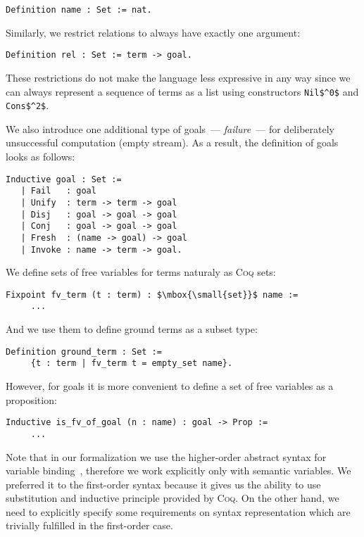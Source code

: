 \begin{lstlisting}[language=Coq]
  Definition name : Set := nat.
\end{lstlisting}

Similarly, we restrict relations to always have exactly one argument:

\begin{lstlisting}[language=Coq]
   Definition rel : Set := term -> goal.
\end{lstlisting}

These restrictions do not make the language less expressive in any way since we can always represent a sequence of terms as a list using constructors \lstinline|Nil$^0$| and \lstinline|Cons$^2$|.

We also introduce one additional type of goals~--- \emph{failure}~--- for deliberately unsuccessful computation (empty stream). As a result, the definition of goals looks as follows:

\begin{lstlisting}[language=Coq] 
   Inductive goal : Set :=
   | Fail   : goal
   | Unify  : term -> term -> goal
   | Disj   : goal -> goal -> goal
   | Conj   : goal -> goal -> goal
   | Fresh  : (name -> goal) -> goal
   | Invoke : name -> term -> goal.
\end{lstlisting}

We define sets of free variables for terms naturaly as \textsc{Coq} sets: 

\begin{lstlisting}[language=Coq,mathescape=true] 
   Fixpoint fv_term (t : term) : $\mbox{\small{set}}$ name :=
     ...
\end{lstlisting}

And we use them to define ground terms as a subset type:

\begin{lstlisting}[language=Coq]
   Definition ground_term : Set :=
     {t : term | fv_term t = empty_set name}.
\end{lstlisting}

However, for goals it is more convenient to define a set of free variables as a proposition:

\begin{lstlisting}[language=Coq]
   Inductive is_fv_of_goal (n : name) : goal -> Prop :=
     ...
\end{lstlisting}

Note that in our formalization we use the higher-order abstract syntax for variable binding~\cite{HOAS}, therefore we work explicitly only with semantic variables.
We preferred it to the first-order syntax because it gives us the ability to use substitution and inductive principle provided by \textsc{Coq}.
On the other hand, we need to explicitly specify some requirements on syntax representation which are trivially fulfilled in the first-order case.

